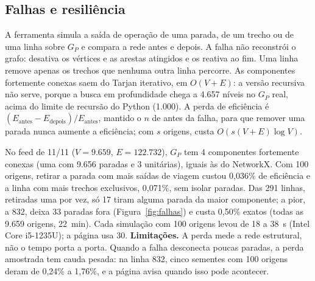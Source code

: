 \subsection{Falhas e resiliência}\label{sec:F-RES}

A ferramenta simula a saída de operação de uma parada, de um trecho ou de uma linha sobre $G_P$
e compara a rede antes e depois. A falha não reconstrói o grafo: desativa os vértices e as
arestas atingidos e os reativa ao fim. Uma linha remove apenas os trechos que nenhuma outra
linha percorre. As componentes fortemente conexas saem do Tarjan iterativo, em $O(V + E)$: a
versão recursiva não serve, porque a busca em profundidade chega a 4.657 níveis no $G_P$ real,
acima do limite de recursão do Python (1.000). A perda de eficiência é
$(E_{\text{antes}} - E_{\text{depois}})/E_{\text{antes}}$, mantido o $n$ de antes da falha, para
que remover uma parada nunca aumente a eficiência; com $s$ origens, custa $O(s(V + E)\log V)$.

No feed de 11/11 ($V = 9{.}659$, $E = 122{.}732$), $G_P$ tem 4 componentes fortemente conexas
(uma com 9.656 paradas e 3 unitárias), iguais às do NetworkX. Com 100 origens, retirar a parada
com mais saídas de viagem custou 0,036\% de eficiência e a linha com mais trechos exclusivos,
0,071\%, sem isolar paradas. Das 291 linhas, retiradas uma por vez, só 17 tiram alguma parada da
maior componente; a pior, a 832, deixa 33 paradas fora (Figura~\ref{fig:falhas}) e custa
0,50\% exatos (todas as 9.659 origens, 22~min). Cada simulação com 100 origens levou de 18 a
38~s (Intel Core i5-1235U); a página usa 30. \textbf{Limitações.} A perda mede a rede
estrutural, não o tempo porta a porta. Quando a falha desconecta poucas paradas, a
perda amostrada tem cauda pesada: na linha 832, cinco sementes com 100 origens deram de 0,24\% a
1,76\%, e a página avisa quando isso pode acontecer.
